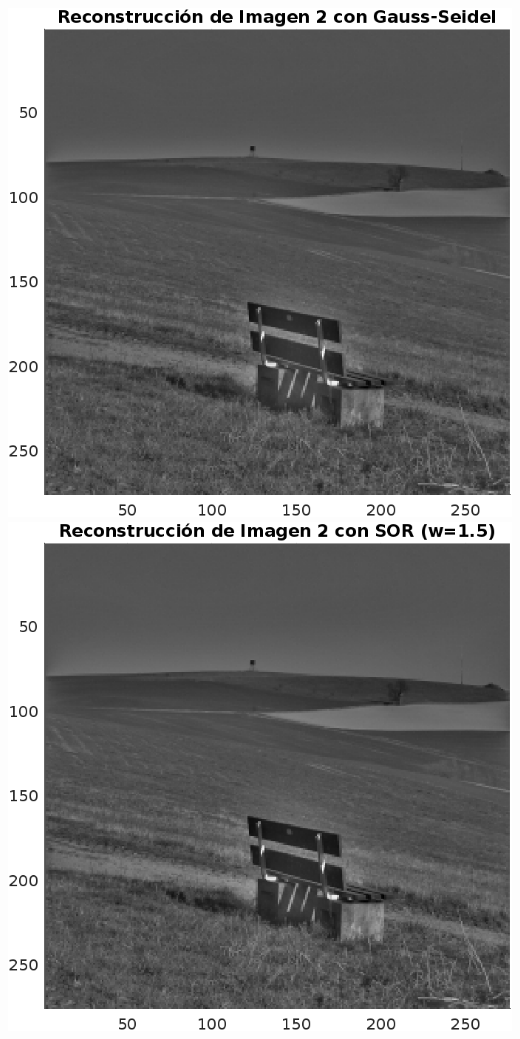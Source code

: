 \begin{homeworkProblem}
\begin{solucion}
\begin{center}
      \includegraphics[scale=0.6]{Figures/Figure_2GS.png}
      \includegraphics[scale=0.6]{Figures/Figure_2SOR.png}

\end{center}
\end{solucion}
\end{homeworkProblem}

